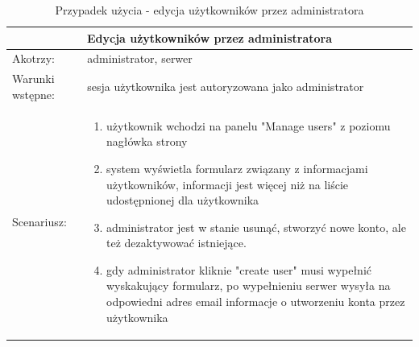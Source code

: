 \begin{table}[h!]
	\begin{tabular}{|p{2cm}||p{13cm}|}
		\hline
		\multicolumn{2}{|c|}{ Edycja użytkowników przez administratora} \\
		\hline
		Akotrzy: & administrator, serwer \\
		\hline
		Warunki wstępne: & sesja użytkownika jest autoryzowana jako administrator  \\
		\hline
		Scenariusz: &
		\begin{enumerate}
			\item użytkownik wchodzi na panelu "Manage users" z poziomu nagłówka strony
			\item system wyświetla formularz związany z informacjami użytkowników, informacji jest więcej niż na liście udostępnionej dla użytkownika
			\item  administrator jest w stanie usunąć, stworzyć nowe konto, ale też dezaktywować istniejące.
			\item gdy administrator kliknie "create user" musi wypełnić wyskakujący formularz, po wypełnieniu serwer wysyła na odpowiedni adres email informacje o utworzeniu konta przez użytkownika
		\end{enumerate}\\
		\hline
	\end{tabular}
	\caption{Przypadek użycia - edycja użytkowników przez  administratora}
\end{table}
